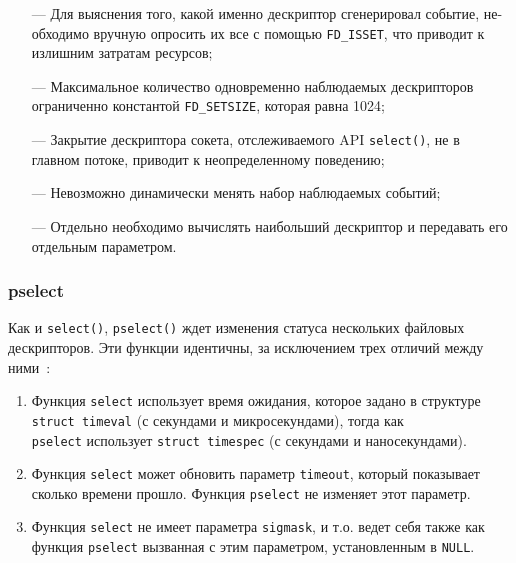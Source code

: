 \begin{itemize}
	\item[---] Для выяснения того, какой именно дескриптор сгенерировал событие, не-обходимо вручную опросить их все с помощью \texttt{FD\_ISSET}, что приводит к излишним затратам ресурсов;
	
	\item[---] Максимальное количество одновременно наблюдаемых дескрипторов\\ ограниченно константой \texttt{FD\_SETSIZE}, которая равна 1024;
	
	\item[---] Закрытие дескриптора сокета, отслеживаемого API \texttt{select()}, не в главном потоке, приводит к неопределенному поведению;
	
	\item[---] Невозможно динамически менять набор наблюдаемых событий;
	
	\item[---] Отдельно необходимо вычислять наибольший дескриптор и передавать его отдельным параметром.
\end{itemize} 

\subsubsection{pselect}

Как и \texttt{select()}, \texttt{pselect()} ждет изменения статуса нескольких файловых дескрипторов. Эти функции идентичны, за исключением трех отличий между ними~\cite{man-pselect}:

\begin{enumerate}
	\item Функция \texttt{select} использует время ожидания, которое задано в структуре \texttt{struct timeval} (с секундами и микросекундами), тогда как\\ \texttt{pselect} использует \texttt{struct timespec} (с секундами и наносекундами).
	
	\item Функция \texttt{select} может обновить параметр \texttt{timeout}, который показывает сколько времени прошло. Функция \texttt{pselect} не изменяет этот параметр.
	
	\item Функция \texttt{select} не имеет параметра \texttt{sigmask}, и т.о. ведет себя также как функция \texttt{pselect} вызванная с этим параметром, установленным в \texttt{NULL}.
\end{enumerate}

